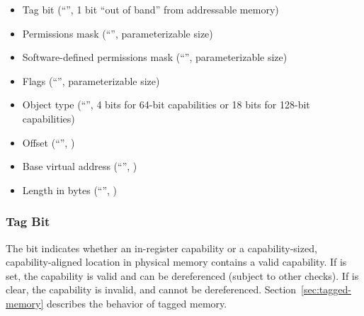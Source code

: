 \begin{itemize}
\item
Tag bit (``\ctag{}'', 1 bit ``out of band'' from addressable memory)
\item
Permissions mask (``\cperms{}'', parameterizable size)
\item
Software-defined permissions mask (``\cuperms{}'', parameterizable size)
\item
Flags (``\cflags{}'', parameterizable size)
\item
Object type (``\cotype{}'', 4 bits for 64-bit capabilities or 18 bits for
  128-bit capabilities)
\item
Offset (``\coffset{}'', \xlen{})
\item
Base virtual address (``\cbase{}'', \xlen{})
\item
Length in bytes (``\clength{}'', \xlen{})
\end{itemize}

\subsubsection{Tag Bit}

The \ctag{} bit indicates whether an in-register capability or a
capability-sized, capability-aligned location in physical memory contains a
valid capability.
If \ctag{} is set, the capability is valid and can be dereferenced (subject to
other checks).
If \ctag{} is clear, the capability is invalid, and cannot be dereferenced.
Section~\ref{sec:tagged-memory} describes the behavior of tagged memory.

%

